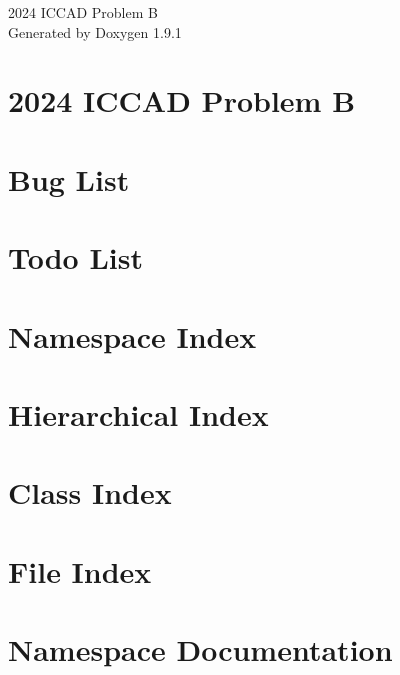 \let\mypdfximage\pdfximage\def\pdfximage{\immediate\mypdfximage}\documentclass[twoside]{book}
\newcommand{\+}{\discretionary{\mbox{\scriptsize$\hookleftarrow$}}{}{}}
\newcommand{\clearemptydoublepage}{%
  \newpage{\pagestyle{empty}\cleardoublepage}%
}
\begin{document}
\raggedbottom

\hypersetup{pageanchor=false,
             bookmarksnumbered=true,
             pdfencoding=unicode
            }
\begin{titlepage}
\vspace*{7cm}
\begin{center}%
{\Large 2024 ICCAD Problem B }\\
\vspace*{1cm}
{\large Generated by Doxygen 1.9.1}\\
\end{center}
\end{titlepage}
\clearemptydoublepage
{}
\tableofcontents
\clearemptydoublepage
{}
\hypersetup{pageanchor=true}

\chapter{2024 ICCAD Problem B}
\label{md_README}

\chapter{Bug List}
\label{bug}

\chapter{Todo List}
\label{todo}

\chapter{Namespace Index}

\chapter{Hierarchical Index}

\chapter{Class Index}

\chapter{File Index}

\chapter{Namespace Documentation}

\end{document}
